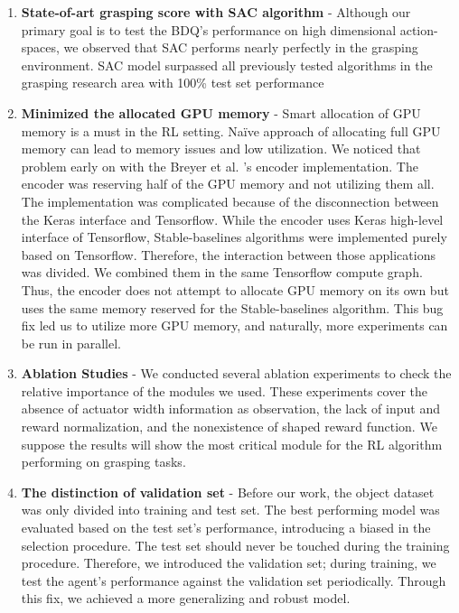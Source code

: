 \begin{enumerate}
    \item \textbf{State-of-art grasping score with SAC algorithm} - Although our primary goal is to test the BDQ's performance on high dimensional action-spaces, we observed that SAC performs nearly perfectly in the grasping environment. SAC model surpassed all previously tested algorithms in the grasping research area with 100\% test set performance
    
    \item \textbf{Minimized the allocated GPU memory
    } - Smart allocation of GPU memory is a must in the RL setting. Naïve approach of allocating full GPU memory can lead to memory issues and low utilization. We noticed that problem early on with the Breyer et al. 's encoder implementation. The encoder was reserving half of the GPU memory and not utilizing them all. The implementation was complicated because of the disconnection between the Keras interface and Tensorflow. While the encoder uses Keras high-level interface of Tensorflow, Stable-baselines algorithms were implemented purely based on Tensorflow. Therefore, the interaction between those applications was divided. We combined them in the same Tensorflow compute graph. Thus, the encoder does not attempt to allocate GPU memory on its own but uses the same memory reserved for the Stable-baselines algorithm. This bug fix led us to utilize more GPU memory, and naturally, more experiments can be run in parallel.
    
    \item \textbf{Ablation Studies
    } - We conducted several ablation experiments to check the relative importance of the modules we used. These experiments cover the absence of actuator width information as observation, the lack of input and reward normalization, and the nonexistence of shaped reward function.  We suppose the results will show the most critical module for the RL algorithm performing on grasping tasks.
    
    \item \textbf{The distinction of validation set
    } -  Before our work, the object dataset was only divided into training and test set. The best performing model was evaluated based on the test set's performance, introducing a biased in the selection procedure.  The test set should never be touched during the training procedure. Therefore, we introduced the validation set; during training, we test the agent's performance against the validation set periodically. Through this fix, we achieved a more generalizing and robust model.
\end{enumerate}



   

 













